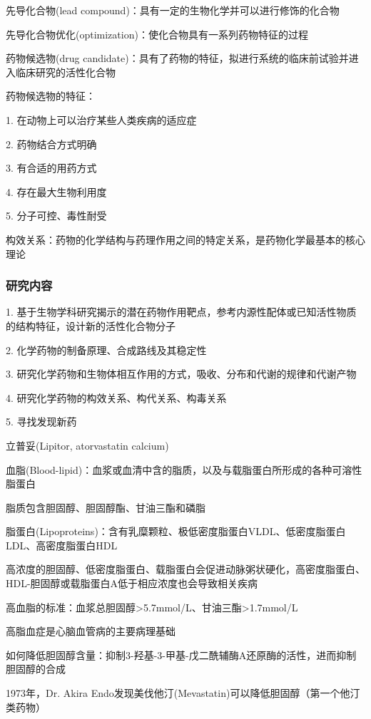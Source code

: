 \begin{defi}
    先导化合物(lead compound)：具有一定的生物化学并可以进行修饰的化合物
\end{defi}
\begin{defi}
    先导化合物优化(optimization)：使化合物具有一系列药物特征的过程
\end{defi}
\begin{defi}
    药物候选物(drug candidate)：具有了药物的特征，拟进行系统的临床前试验并进入临床研究的活性化合物
\end{defi}
\begin{notation}
    药物候选物的特征：

    1. 在动物上可以治疗某些人类疾病的适应症

    2. 药物结合方式明确

    3. 有合适的用药方式

    4. 存在最大生物利用度

    5. 分子可控、毒性耐受
\end{notation}
\begin{defi}
    构效关系：药物的化学结构与药理作用之间的特定关系，是药物化学最基本的核心理论
\end{defi}
\subsubsection{研究内容}%
\label{subsub:研究内容}
1. 基于生物学科研究揭示的潜在药物作用靶点，参考内源性配体或已知活性物质的结构特征，设计新的活性化合物分子

2. 化学药物的制备原理、合成路线及其稳定性

3. 研究化学药物和生物体相互作用的方式，吸收、分布和代谢的规律和代谢产物

4. 研究化学药物的构效关系、构代关系、构毒关系

5. 寻找发现新药
\begin{eg}
    立普妥(Lipitor, atorvastatin calcium)
\end{eg}
\begin{notation}
    血脂(Blood-lipid)：血浆或血清中含的脂质，以及与载脂蛋白所形成的各种可溶性脂蛋白

    脂质包含胆固醇、胆固醇酯、甘油三酯和磷脂
\end{notation}
\begin{notation}
    脂蛋白(Lipoproteins)：含有乳糜颗粒、极低密度脂蛋白VLDL、低密度脂蛋白LDL、高密度脂蛋白HDL

    高浓度的胆固醇、低密度脂蛋白、载脂蛋白会促进动脉粥状硬化，高密度脂蛋白、HDL-胆固醇或载脂蛋白A低于相应浓度也会导致相关疾病
\end{notation}
\begin{notation}
    高血脂的标准：血浆总胆固醇>5.7mmol/L、甘油三酯>1.7mmol/L

    高脂血症是心脑血管病的主要病理基础

    如何降低胆固醇含量：抑制3-羟基-3-甲基-戊二酰辅酶A还原酶的活性，进而抑制胆固醇的合成

    1973年，Dr. Akira Endo发现美伐他汀(Mevastatin)可以降低胆固醇（第一个他汀类药物）
\end{notation}


